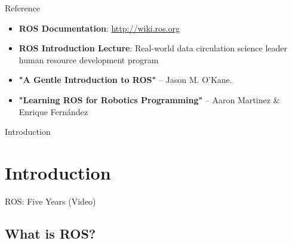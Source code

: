 \documentclass[10pt]{beamer}
\begin{document}
 \begin{frame}{Reference}
  \begin{itemize}
   \item {\bf{ROS Documentation}}: \url{http://wiki.ros.org}
   \item {\bf{ROS Introduction Lecture}}: Real-world data circulation science leader human resource development program
   \item {\bf{"A Gentle Introduction to ROS"}} -- Jason M. O'Kane.
   \item {\bf{"Learning ROS for Robotics Programming"}} -- Aaron Martinez \& Enrique Fernández
  \end{itemize}
 \end{frame}

  \begin{frame}{}
  \begin{center}
   \LARGE Introduction
  \end{center}
 \end{frame}
 
 \section{Introduction}
 
 \begin{frame}{ROS: Five Years (Video)}
 \end{frame}
 
 \subsection{What is ROS?}
 
\end{document}
